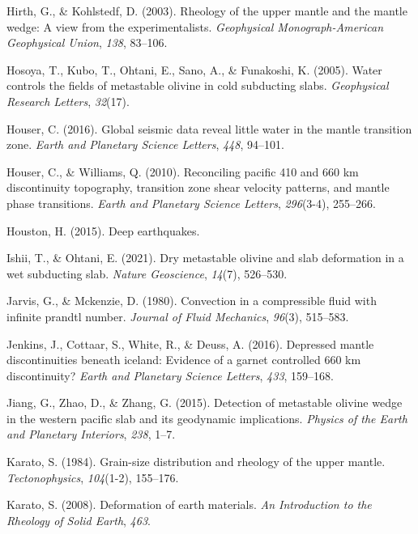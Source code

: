 \documentclass[draft,linenumbers]{agujournal2019}
\newlength{\cslhangindent}
\newenvironment{CSLReferences}[2]
 {\begin{list}{}{
  \setlength{\itemindent}{0pt}
  \setlength{\leftmargin}{0pt}
  \setlength{\parsep}{0pt}
  \ifodd #1
   \setlength{\leftmargin}{\cslhangindent}
   \setlength{\itemindent}{-\cslhangindent}
  \fi
  \setlength{\itemsep}{#2\baselineskip}
  }
  \item\relax}
 {\end{list}}
\begin{document}
\begin{CSLReferences}{1}{0}
Hirth, G., \& Kohlstedf, D. (2003). Rheology of the upper mantle and the
mantle wedge: A view from the experimentalists. \emph{Geophysical
Monograph-American Geophysical Union}, \emph{138}, 83--106.

Hosoya, T., Kubo, T., Ohtani, E., Sano, A., \& Funakoshi, K. (2005).
Water controls the fields of metastable olivine in cold subducting
slabs. \emph{Geophysical Research Letters}, \emph{32}(17).

Houser, C. (2016). Global seismic data reveal little water in the mantle
transition zone. \emph{Earth and Planetary Science Letters}, \emph{448},
94--101.

Houser, C., \& Williams, Q. (2010). Reconciling pacific 410 and 660 km
discontinuity topography, transition zone shear velocity patterns, and
mantle phase transitions. \emph{Earth and Planetary Science Letters},
\emph{296}(3-4), 255--266.

Houston, H. (2015). Deep earthquakes.

Ishii, T., \& Ohtani, E. (2021). Dry metastable olivine and slab
deformation in a wet subducting slab. \emph{Nature Geoscience},
\emph{14}(7), 526--530.

Jarvis, G., \& Mckenzie, D. (1980). Convection in a compressible fluid
with infinite prandtl number. \emph{Journal of Fluid Mechanics},
\emph{96}(3), 515--583.

Jenkins, J., Cottaar, S., White, R., \& Deuss, A. (2016). Depressed
mantle discontinuities beneath iceland: Evidence of a garnet controlled
660 km discontinuity? \emph{Earth and Planetary Science Letters},
\emph{433}, 159--168.

Jiang, G., Zhao, D., \& Zhang, G. (2015). Detection of metastable
olivine wedge in the western pacific slab and its geodynamic
implications. \emph{Physics of the Earth and Planetary Interiors},
\emph{238}, 1--7.

Karato, S. (1984). Grain-size distribution and rheology of the upper
mantle. \emph{Tectonophysics}, \emph{104}(1-2), 155--176.

Karato, S. (2008). Deformation of earth materials. \emph{An Introduction
to the Rheology of Solid Earth}, \emph{463}.


\end{CSLReferences}
\end{document}
